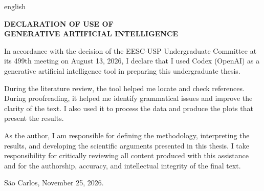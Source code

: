 \clearpage
\begin{otherlanguage*}{english}
\thispagestyle{empty}
\begin{center}
  \ABNTEXchapterfont\large\bfseries
  DECLARATION OF USE OF\\
  GENERATIVE ARTIFICIAL INTELLIGENCE
\end{center}

In accordance with the decision of the EESC-USP Undergraduate Committee at its 499th meeting on August 13, 2026, I declare that I used Codex (OpenAI) as a generative artificial intelligence tool in preparing this undergraduate thesis.

During the literature review, the tool helped me locate and check references. During proofreading, it helped me identify grammatical issues and improve the clarity of the text. I also used it to process the data and produce the plots that present the results.

As the author, I am responsible for defining the methodology, interpreting the results, and developing the scientific arguments presented in this thesis. I take responsibility for critically reviewing all content produced with this assistance and for the authorship, accuracy, and intellectual integrity of the final text.

\begin{flushright}
  São Carlos, November 25, 2026.\\
  \imprimirautor
\end{flushright}
\end{otherlanguage*}
\endgroup

